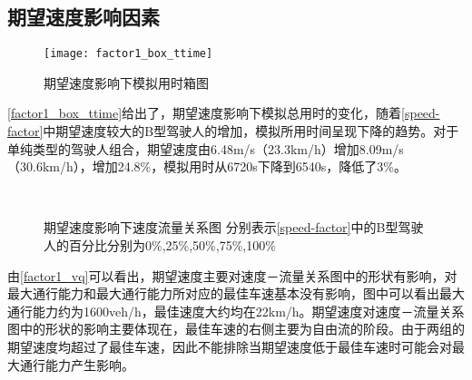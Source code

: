 \subsection{期望速度影响因素}

\begin{figure}[H]
\begin{center}
\texttt{[image: factor1\_box\_ttime]}
\caption{期望速度影响下模拟用时箱图}
\label{factor1_box_ttime}
\end{center}
\end{figure}

\autoref{factor1_box_ttime}给出了，期望速度影响下模拟总用时的变化，随着\autoref{speed-factor}中期望速度较大的B型驾驶人的增加，模拟所用时间呈现下降的趋势。对于单纯类型的驾驶人组合，期望速度由6.48m/s（23.3km/h）增加8.09m/s（30.6km/h），增加24.8\%，模拟用时从6720s下降到6540s，降低了3\%。


\begin{figure}[H]%
\centering
{}%
\\%
%
\caption[A set of four sub-floats.]{期望速度影响下速度流量关系图
分别表示\autoref{speed-factor}中的B型驾驶人的百分比分别为0\%,25\%,50\%,75\%,100\%}%
\label{factor1_vq}%
\end{figure}

由\autoref{factor1_vq}可以看出，期望速度主要对速度－流量关系图中的形状有影响，对最大通行能力和最大通行能力所对应的最佳车速基本没有影响，图中可以看出最大通行能力约为1600veh/h，最佳速度大约均在22km/h。期望速度对速度－流量关系图中的形状的影响主要体现在，最佳车速的右侧主要为自由流的阶段。由于两组的期望速度均超过了最佳车速，因此不能排除当期望速度低于最佳车速时可能会对最大通行能力产生影响。




